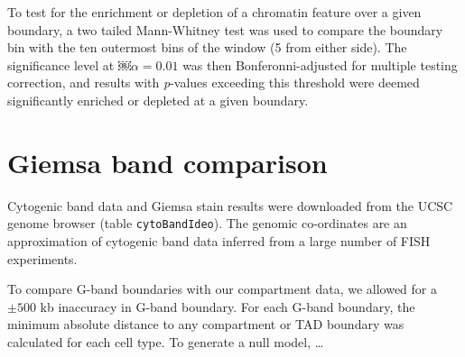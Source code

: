 \documentclass[a4paper,10pt,oneside]{book}
\begin{document}
To test for the enrichment or depletion of a chromatin feature over a
given boundary, a two tailed Mann-Whitney test was used to compare the
boundary bin with the ten outermost bins of the window (5 from either
side). The significance level at ￼$\alpha = 0.01$ was then
Bonferonni-adjusted for multiple testing correction, and results with
\emph{p}-values exceeding this threshold were deemed significantly
enriched or depleted at a given boundary.

\section{Giemsa band comparison}\label{giemsa-band-comparison}

Cytogenic band data and Giemsa stain results were downloaded from the
UCSC genome browser (table \texttt{cytoBandIdeo}). The genomic
co-ordinates are an approximation of cytogenic band data inferred from a
large number of FISH experiments.\citep{Furey2003}

To compare G-band boundaries with our compartment data, we allowed for a
$\pm 500$ kb inaccuracy in G-band boundary. For each G-band boundary,
the minimum absolute distance to any compartment or TAD boundary was
calculated for each cell type. To generate a null model, \ldots


\begin{small}

\end{small}
\end{document}
